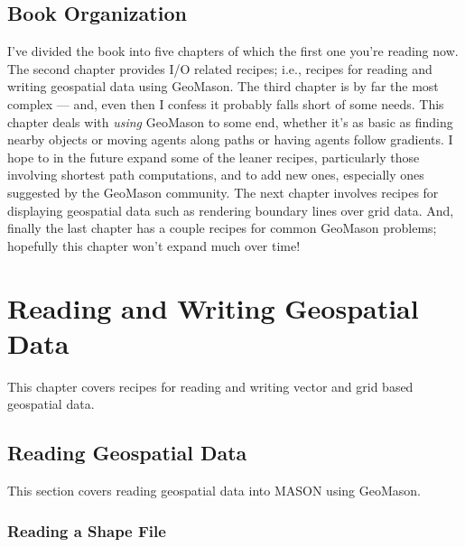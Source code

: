 \documentclass[twoside,10pt]{book}
\begin{document}
\section{Book Organization}

I've divided the book into five chapters of which the first one
you're reading now.  The second chapter provides I/O related recipes;
i.e., recipes for reading and writing geospatial data using GeoMason.
The third chapter is by far the most complex --- and, even then I
confess it probably falls short of some needs.  This chapter deals
with \emph{using} GeoMason to some end, whether it's as basic as
finding nearby objects or moving agents along paths or having agents
follow gradients. I hope to in the future expand some of the leaner
recipes, particularly those involving shortest path computations, and
to add new ones, especially ones suggested by the GeoMason community.
The next chapter involves recipes for displaying geospatial data such
as rendering boundary lines over grid data.  And, finally the last
chapter has a couple recipes for common GeoMason problems; hopefully
this chapter won't expand much over time!



\chapter{Reading and Writing Geospatial Data}
\label{ch:io}

This chapter covers recipes for reading and writing vector and grid based geospatial data.

\section{Reading Geospatial Data}
\label{sec:readingdata}
This section covers reading geospatial data into MASON using GeoMason.

\subsection{Reading a Shape File}
\label{sub:readingshapefiles}
\end{document}
